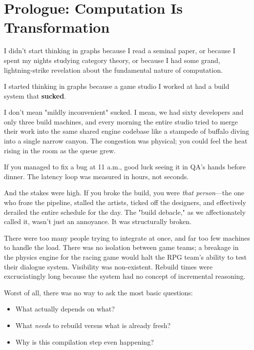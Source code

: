 \chapter*{Prologue: Computation Is Transformation}\label{chap:computation-is-transformation}

I didn't start thinking in graphs because I read a seminal paper, or because I spent my nights studying category theory, or because I had some grand, lightning-strike revelation about the fundamental nature of computation.

I started thinking in graphs because a game studio I worked at had a build system that \textbf{sucked}.

I don't mean "mildly inconvenient" sucked. I mean, we had sixty developers and only three build machines, and every morning the entire studio tried to merge their work into the same shared engine codebase like a stampede of buffalo diving into a single narrow canyon. The congestion was physical; you could feel the heat rising in the room as the queue grew.

If you managed to fix a bug at 11 a.m., good luck seeing it in QA's hands before dinner. The latency loop was measured in hours, not seconds.

And the stakes were high. If you broke the build, you were \textit{that person}—the one who froze the pipeline, stalled the artists, ticked off the designers, and effectively derailed the entire schedule for the day. The "build debacle," as we affectionately called it, wasn't just an annoyance. It was structurally broken.

There were too many people trying to integrate at once, and far too few machines to handle the load. There was no isolation between game teams; a breakage in the physics engine for the racing game would halt the RPG team's ability to test their dialogue system. Visibility was non-existent. Rebuild times were excruciatingly long because the system had no concept of incremental reasoning.

Worst of all, there was no way to ask the most basic questions:
\begin{itemize}
    \item What actually depends on what?
    \item What \textit{needs} to rebuild versus what is already fresh?
    \item Why is this compilation step even happening?
\end{itemize}

